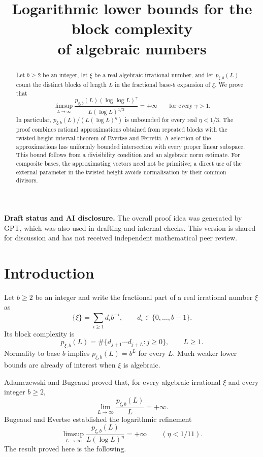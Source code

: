 \documentclass[11pt]{article}
\title{Logarithmic lower bounds for the block complexity\\of algebraic numbers}
\author{}
\date{}
\numberwithin{equation}{section}
\theoremstyle{remark}
\begin{document}
\maketitle

\begin{abstract}
Let $b\ge2$ be an integer, let $\xi$ be a real algebraic irrational number,
and let $p_{\xi,b}(L)$ count the distinct blocks of length $L$ in the
fractional base-$b$ expansion of $\xi$. We prove that
\[
 \limsup_{L\to\infty}
 \frac{p_{\xi,b}(L)(\log\log L)^\gamma}{L(\log L)^{1/3}}
 =+\infty
 \qquad\text{for every }\gamma>1.
\]
In particular, $p_{\xi,b}(L)/(L(\log L)^\eta)$ is unbounded for every
real $\eta<1/3$.
The proof combines rational approximations obtained from repeated blocks
with the twisted-height interval theorem of Evertse and Ferretti.
A selection of the approximations has uniformly bounded intersection
with every proper linear subspace. This bound follows from a divisibility
condition and an algebraic norm estimate. For composite bases, the
approximating vectors need not be primitive; a direct use of the external
parameter in the twisted height avoids normalisation by their common
divisors.
\end{abstract}

\medskip
\noindent\textbf{Draft status and AI disclosure.}
The overall proof idea was generated by GPT, which was also used in drafting
and internal checks. This version is shared for discussion and has not
received independent mathematical peer review.

\section{Introduction}\label{sec:intro}

Let $b\ge2$ be an integer and write the fractional part of a real irrational
number $\xi$ as
\[
 \{\xi\}=\sum_{i\ge1}d_i b^{-i},\qquad d_i\in\{0,\ldots,b-1\}.
\]
Its block complexity is
\[
 p_{\xi,b}(L)
 =\#\{d_{j+1}\cdots d_{j+L}:j\ge0\},\qquad L\ge1.
\]
Normality to base $b$ implies $p_{\xi,b}(L)=b^L$ for every $L$.
Much weaker lower bounds are already of interest when $\xi$ is algebraic.

Adamczewski and Bugeaud \cite[Theorem~1]{AB07} proved that, for every
algebraic irrational $\xi$ and every integer $b\ge2$,
\[
 \lim_{L\to\infty}\frac{p_{\xi,b}(L)}{L}=+\infty.
\]
Bugeaud and Evertse \cite[Theorem~2.1]{BE08} established the logarithmic
refinement
\[
 \limsup_{L\to\infty}
 \frac{p_{\xi,b}(L)}{L(\log L)^\eta}=+\infty
 \qquad(\eta<1/11).
\]
The result proved here is the following.
\end{document}

